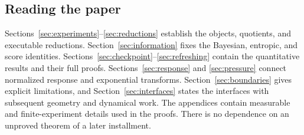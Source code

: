 \subsection{Reading the paper}
Sections~\ref{sec:experiments}--\ref{sec:reductions} establish the objects,
quotients, and executable reductions. Section~\ref{sec:information} fixes
the Bayesian, entropic, and score identities.
Sections~\ref{sec:checkpoint}--\ref{sec:refreshing} contain the quantitative
results and their full proofs. Sections~\ref{sec:response} and
\ref{sec:pressure} connect normalized response and exponential transforms.
Section~\ref{sec:boundaries} gives explicit limitations, and
Section~\ref{sec:interfaces} states the interfaces with subsequent geometry
and dynamical work. The appendices contain measurable and finite-experiment
details used in the proofs. There is no dependence on an unproved theorem
of a later installment.
